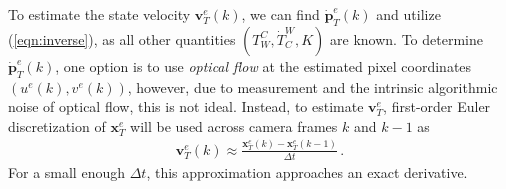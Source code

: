 \documentclass[11pt]{article}
\begin{document}
To estimate the state velocity $\mathbf v_T^e(k)$, we can find $\dot{\mathbf p}_T^e(k)$ and utilize (\ref{eqn:inverse}), as all other quantities $(T_W^C,\dot T_C^W,K)$ are known. To determine $\dot{\mathbf p}_T^e(k)$, one option is to use \textit{optical flow} at the estimated pixel coordinates $(u^e(k),v^e(k))$, however, due to measurement and the intrinsic algorithmic noise of optical flow, this is not ideal. Instead, to estimate $\mathbf v_T^e$, first-order Euler discretization of $\mathbf x_T^e$ will be used across camera frames $k$ and $k-1$ as
\begin{align}\label{eqn:vTe}
    \mathbf v_T^e(k)\approx\frac{\mathbf x_T^e(k)-\mathbf x_T^e(k-1)}{\Delta t}\,.
\end{align}
For a small enough $\Delta t$, this approximation approaches an exact derivative.
\end{document}
